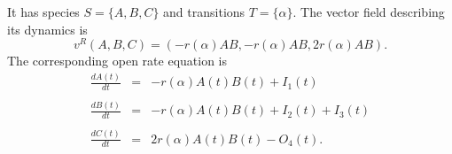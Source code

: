 \documentclass{compositionalityarticle}
\theoremstyle{plain}
\theoremstyle{remark}
\begin{document}
It has species $S = \{A,B,C\}$ and transitions $T = \{\alpha\}$.  
The vector field describing its dynamics is 
\begin{equation}
\label{eq_v_1}
 v^R(A,B,C) = ( -r(\alpha) AB, -r(\alpha) AB , 2r(\alpha) AB). 
\end{equation}
The corresponding open rate equation is 
\begin{equation}
\label{eq:open_rate_1}
\begin{array}{rcl} 
\displaystyle{\frac{dA(t)}{dt}} &=& - r(\alpha) A(t) B(t)  + I_1(t)\\ \\
\displaystyle{\frac{dB(t)}{dt}} &=& - r(\alpha) A(t) B(t) + I_2(t) + I_3(t) \\ \\
\displaystyle{\frac{dC(t)}{dt}} &=& 2r(\alpha) A(t) B(t) - O_4(t).
\end{array}
\end{equation}
\end{document}

